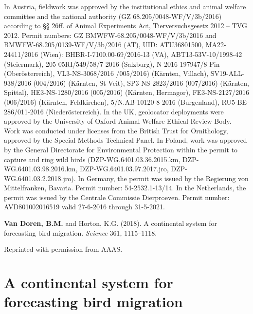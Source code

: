 \documentclass[a4paper, nobind]{templates/ociamthesis}
\begin{document}
In Austria, fieldwork was approved by the institutional ethics and animal welfare committee and the national authority (GZ 68.205/0048-WF/V/3b/2016) according to §§ 26ff. of Animal Experiments Act, Tierversuchsgesetz 2012 -- TVG 2012. Permit numbers: GZ BMWFW-68.205/0048-WF/V/3b/2016 and BMWFW-68.205/0139-WF/V/3b/2016 (AT), UID: ATU36801500, MA22-24411/2016 (Wien): BHBR-I-7100.00-69/2016-13 (VA), ABT13-53V-10/1998-42 (Steiermark), 205-05RI/549/58/7-2016 (Salzburg), N-2016-197947/8-Pin (Oberösterreich), VL3-NS-3068/2016 /005/2016) (Kärnten, Villach), SV19-ALL-938/2016 (004/2016) (Kärnten, St Veit), SP3-NS-2823/2016 (007/2016) (Kärnten, Spittal), HE3-NS-1280/2016 (005/2016) (Kärnten, Hermagor), FE3-NS-2127/2016 (006/2016) (Kärnten, Feldkirchen), 5/N.AB-10120-8-2016 (Burgenland), RU5-BE-286/011-2016 (Niederösterreich). In the UK, geolocator deployments were approved by the University of Oxford Animal Welfare Ethical Review Body. Work was conducted under licenses from the British Trust for Ornithology, approved by the Special Methods Technical Panel. In Poland, work was approved by the General Directorate for Environmental Protection within the permit to capture and ring wild birds (DZP-WG.6401.03.36.2015.km, DZP-WG.6401.03.98.2016.km, DZP-WG.6401.03.97.2017.jro, DZP-WG.6401.03.2.2018.jro). In Germany, the permit was issued by the Regierung von Mittelfranken, Bavaria. Permit number: 54-2532.1-13/14. In the Netherlands, the permit was issued by the Centrale Commissie Dierproeven. Permit number: AVD801002016519 valid 27-6-2016 through 31-5-2021.

\clearpage \printbibliography[segment=  herefsection,heading=subbibliography]

\begin{savequote}
\textbf{Van Doren, B.M.} and Horton, K.G. (2018). A continental system
for forecasting bird migration. \emph{Science} 361, 1115--1118.

Reprinted with permission from AAAS.
\end{savequote}

\hypertarget{forecast}{
\chapter[A continental system for forecasting bird migration]{A continental system for\\forecasting bird migration}\label{forecast}}

\newpage
\end{document}
